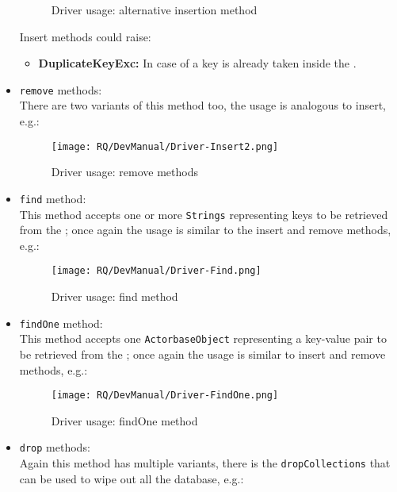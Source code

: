 \documentclass{scalatekids-article}
\begin{document}
\begin{itemize}
\begin{figure}[H]
\begin{center}
      \caption{Driver usage: alternative insertion method}
    \end{center}
  \end{figure}
  Insert methods could raise:
  \begin{itemize}
  \item \textbf{DuplicateKeyExc:} In case of a key is already taken inside the .
  \end{itemize}
\item \verb=remove= methods:\\ There are two variants of this method too, the usage is
  analogous to insert, e.g.:
  \begin{figure}[H]
    \begin{center}
      \texttt{[image: RQ/DevManual/Driver-Insert2.png]}
      \caption{Driver usage: remove methods}
    \end{center}
  \end{figure}
\item \verb=find= method:\\ This method accepts one or more \verb=Strings= representing
  keys to be retrieved from the ; once again the usage is similar to the insert and
  remove methods, e.g.:
  \begin{figure}[H]
    \begin{center}
      \texttt{[image: RQ/DevManual/Driver-Find.png]}
      \caption{Driver usage: find method}
    \end{center}
  \end{figure}
\item \verb=findOne= method:\\ This method accepts one \verb=ActorbaseObject= representing
  a key-value pair to be retrieved from the ; once again the usage is similar to insert and
  remove methods, e.g.:
  \begin{figure}[H]
    \begin{center}
      \texttt{[image: RQ/DevManual/Driver-FindOne.png]}
      \caption{Driver usage: findOne method}
    \end{center}
  \end{figure}
\item \verb=drop= methods:\\ Again this method has multiple variants, there is the
  \verb=dropCollections= that can be used to wipe out all the database, e.g.:
  \begin{figure}[H]

\end{figure}
\end{itemize}
\end{document}
